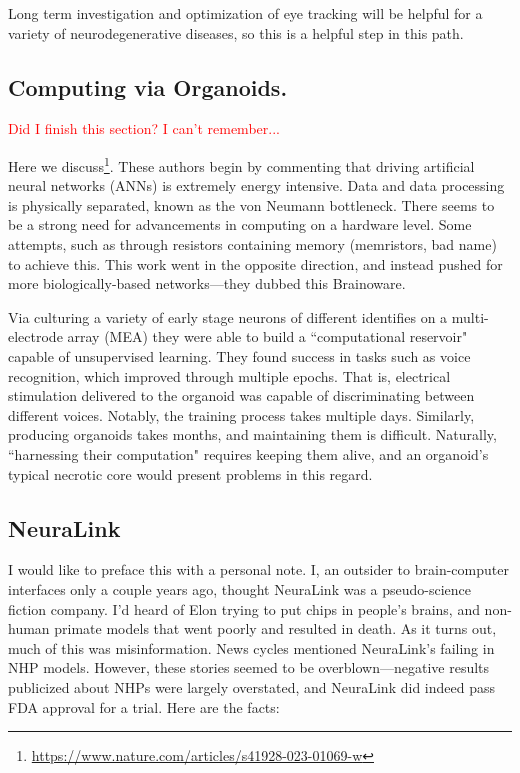 Long term investigation and optimization of eye tracking will be helpful for a variety of neurodegenerative diseases, so this is a helpful step in this path. 

\subsection{Computing via Organoids.}

\textcolor{red}{Did I finish this section? I can't remember...}

Here we discuss\footnote{\url{https://www.nature.com/articles/s41928-023-01069-w}}. These authors begin by commenting that driving artificial neural networks (ANNs) is extremely energy intensive. Data and data processing is physically separated, known as the von Neumann bottleneck. There seems to be a strong need for advancements in computing on a hardware level. Some attempts, such as through resistors containing memory (memristors, bad name) to achieve this. This work went in the opposite direction, and instead pushed for more biologically-based networks---they dubbed this Brainoware.\newline

Via culturing a variety of early stage neurons of different identifies on a multi-electrode array (MEA) they were able to build a ``computational reservoir" capable of unsupervised learning. They found success in tasks such as voice recognition, which improved through multiple epochs. That is, electrical stimulation delivered to the organoid was capable of discriminating between different voices. Notably, the training process takes multiple days. Similarly, producing organoids takes months, and maintaining them is difficult. Naturally, ``harnessing their computation" requires keeping them alive, and an organoid's typical necrotic core would present problems in this regard. 


\subsection{NeuraLink}

I would like to preface this with a personal note. I, an outsider to brain-computer interfaces only a couple years ago, thought NeuraLink was a pseudo-science fiction company. I'd heard of Elon trying to put chips in people's brains, and non-human primate models that went poorly and resulted in death. As it turns out, much of this was misinformation. News cycles mentioned NeuraLink's failing in NHP models. However, these stories seemed to be overblown---negative results publicized about NHPs were largely overstated, and NeuraLink did indeed pass FDA approval for a trial. Here are the facts:\newline


